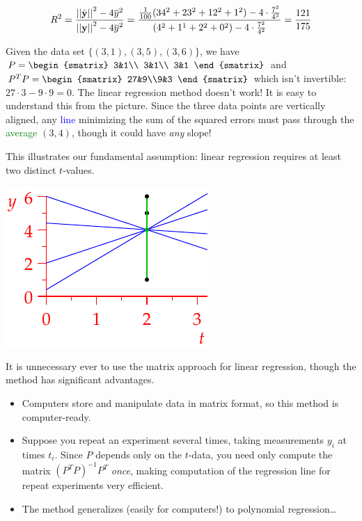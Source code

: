 \begin{examples}{}{}
	\[
		R^2=\frac{\left| \left| \hat{{\mathbf{y}}}\right|\right|^2-4\overline{y}^2}{\left| \left| {\mathbf{y}}\right|\right|^2-4\overline{y}^2} =\frac{\frac 1{100}(34^2+23^2+12^2+1^2)-4\cdot\frac{7^2}{4^2}}{(4^2+1^1+2^2+0^2)-4\cdot\frac{7^2}{4^2}} =\frac{121}{175}
	\]
	\begin{enumerate}\setcounter{enumi}{1}
	  \begin{minipage}[t]{0.65\linewidth}\vspace{0pt}
		  \item Given the data set $\{(3,1),(3,5),(3,6)\}$, we have $P=
		  \begin{smatrix}
		   3&1\\
		   3&1\\
		   3&1
		  \end{smatrix}$ and $P^TP=
		  \begin{smatrix}
		   27&9\\9&3
		  \end{smatrix}$ 
		  which isn't invertible: $27\cdot 3-9\cdot 9=0$. The linear regression method doesn't work!\smallbreak
		  It is easy to understand this from the picture. Since the three data points are vertically aligned, any \textcolor{blue}{line} minimizing the sum of the squared errors must pass through the \textcolor{Green}{average} $(3,4)$, though it could have \emph{any} slope!\par
		  This illustrates our fundamental assumption: linear regression requires at least two distinct $t$-values.
		\end{minipage}
		\hfill
		\begin{minipage}[t]{0.34\linewidth}\vspace{0pt}
		  \flushright\includegraphics{reg-line6}
	  \end{minipage}
	\end{enumerate}
\end{examples}

It is unnecessary ever to use the matrix approach for linear regression, though the method has significant advantages.
\begin{itemize}\itemsep2pt
  \item Computers store and manipulate data in matrix format, so this method is computer-ready.
  \item Suppose you repeat an experiment several times, taking measurements $y_i$ at times $t_i$. Since $P$ depends only on the $t$-data, you need only compute the matrix $(P^TP)^{-1}P^T$ \emph{once}, making computation of the regression line for repeat experiments very efficient. 
  \item The method generalizes (easily for computers!) to polynomial regression\ldots
\end{itemize}


